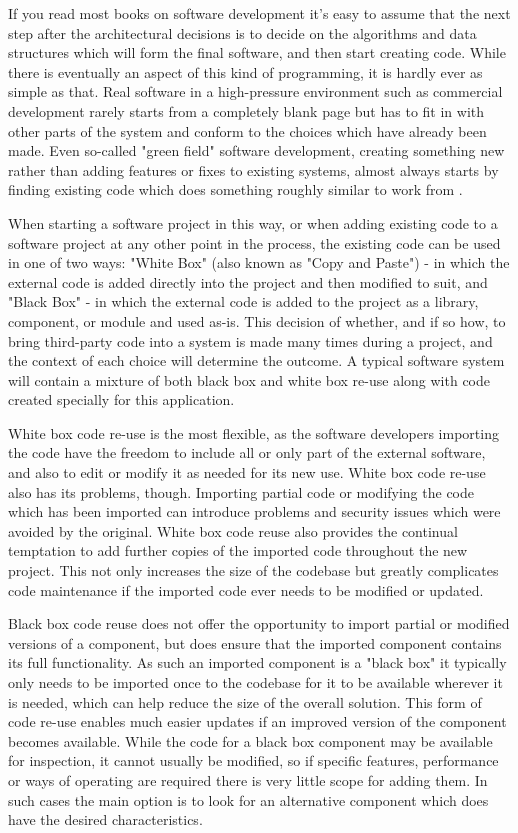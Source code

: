 If you read most books on software development  it's easy to assume that the next step after the architectural decisions is to decide on the algorithms and data structures which will form the final software, and then start creating code. While there is eventually an aspect of this kind of programming, it is hardly ever as simple as that. Real software in a high-pressure environment such as commercial development rarely starts from a completely blank page but has to fit in with other parts of the system and conform to the choices which have already been made. Even so-called "green field" software development, creating something new rather than adding features or fixes to existing systems, almost always starts by finding existing code which does something roughly similar to work from .

When starting a software project in this way, or when adding existing code to a software project at any other point in the process, the existing code can be used in one of two ways: "White Box" (also known as "Copy and Paste") - in which the external code is added directly into the project and then modified to suit, and "Black Box" - in which the external code is added to the project as a library, component, or module and used as-is. This decision of whether, and if so how, to bring third-party code into a system is made many times during a project, and the context of each choice will determine the outcome. A typical software system will contain a mixture of both black box and white box re-use along with code created specially for this application.

White box code re-use is the most flexible, as the software developers importing the code have the freedom to include all or only part of the external software, and also to edit or modify it as needed for its new use. White box code re-use also has its problems, though. Importing partial code or modifying the code which has been imported can introduce problems and security issues which were avoided by the original. White box code reuse also provides the continual temptation to add further copies of the imported code throughout the new project. This not only increases the size of the codebase but greatly complicates code maintenance if the imported code ever needs to be modified or updated.

Black box code reuse does not offer the opportunity to import partial or modified versions of a component, but does ensure that the imported component contains its full functionality. As such an imported component is a "black box" it typically only needs to be imported once to the codebase for it to be available wherever it is needed, which can help reduce the size of the overall solution. This form of code re-use enables much easier updates if an improved version of the component becomes available. While the code for a black box component may be available for inspection, it cannot usually be modified, so if specific features, performance or ways of operating are required there is very little scope for adding them. In such cases the main option is to look for an alternative component which does have the desired characteristics.

